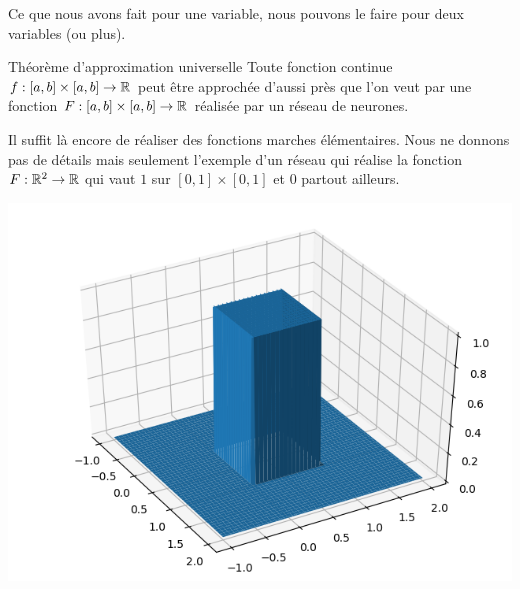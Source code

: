 Ce que nous avons fait pour une variable, nous pouvons le faire pour deux variables (ou plus).

\begin{theoreme}{Théorème d'approximation universelle}{}
	Toute fonction continue $f : [a,b]\times [a,b] \to \mathbb{R}$ peut être approchée d'aussi près que l'on veut par une fonction $F : [a,b]\times [a,b] \to \mathbb{R}$ réalisée par un réseau de neurones.
\end{theoreme}

Il suffit là encore de réaliser des fonctions marches élémentaires. Nous ne donnons pas de détails mais seulement l'exemple d'un réseau qui réalise la fonction
$F : \mathbb{R}^2 \to \mathbb{R}$ qui vaut $1$ sur $[0,1]\times [0,1]$ et $0$ partout ailleurs.





\begin{center}
	\begin{minipage}{0.45\textwidth}
	\end{minipage}
	\begin{minipage}{0.45\textwidth}
		\includegraphics[scale=\myscale,scale=0.5]{figures/neurones-surface-1}
	\end{minipage}
\end{center}
